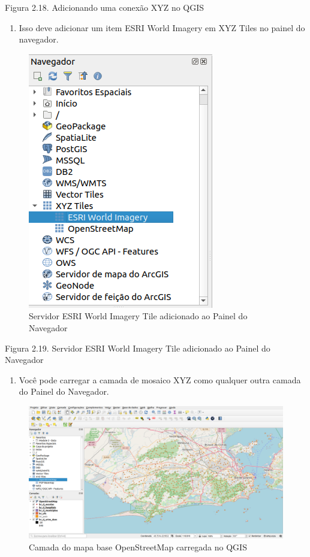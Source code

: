 \documentclass[
]{book}
\providecommand{\tightlist}{%
  \setlength{\itemsep}{0pt}\setlength{\parskip}{0pt}}
\begin{document}
Figura 2.18. Adicionando uma conexão XYZ no QGIS

\begin{enumerate}
\def\labelenumi{\arabic{enumi}.}
\setcounter{enumi}{4}
\tightlist
\item
  Isso deve adicionar um item ESRI World Imagery em XYZ Tiles no painel do navegador.
\end{enumerate}

\begin{figure}
\centering
\includegraphics{media/modulo2/xyz-2.png}
\caption{Servidor ESRI World Imagery Tile adicionado ao Painel do Navegador}
\end{figure}

Figura 2.19. Servidor ESRI World Imagery Tile adicionado ao Painel do Navegador

\begin{enumerate}
\def\labelenumi{\arabic{enumi}.}
\setcounter{enumi}{5}
\tightlist
\item
  Você pode carregar a camada de mosaico XYZ como qualquer outra camada do Painel do Navegador.
\end{enumerate}

\begin{figure}
\centering
\includegraphics{media/modulo2/xyz-3.png}
\caption{Camada do mapa base OpenStreetMap carregada no QGIS}
\end{figure}
\end{document}
